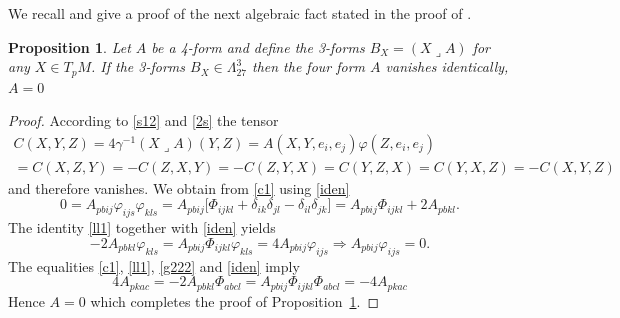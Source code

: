 \documentclass[10pt,british]{article}
\newtheorem{prop}[thrm]{Proposition}
\def\p{{\varphi}}
\def\ph{{\Phi}}
\begin{document}
We recall and give a proof of the next algebraic fact stated  in the proof of \cite[Theorem~5.4]{FI}.
\begin{prop}\cite[p. 319]{FI}\label{4-for}
Let $A$ be a 4-form and define the 3-forms $B_X=(X\lrcorner A)$ for any $X\in T_pM$. If  the 3-forms $B_X\in\Lambda^3_{27}$ then the four form $A$ vanishes identically, $A=0$
\end{prop}
\begin{proof}
According to \eqref{s12} and \eqref{2s} the tensor
\begin{multline}\label{c1}
C(X,Y,Z)=4\gamma^{-1}(X\lrcorner A)(Y,Z)=A(X,Y,e_i,e_j)\p(Z,e_i,e_j)\\=C(X,Z,Y)=-C(Z,X,Y)=-C(Z,Y,X)=C(Y,Z,X)=C(Y,X,Z)=-C(X,Y,Z)
\end{multline}
and therefore vanishes. We  obtain from \eqref{c1} using  \eqref{iden}
\begin{equation}\label{ll1}
0=A_{pbij}\p_{ijs}\p_{kls}=A_{pbij}\big[\ph_{ijkl}+\delta_{ik}\delta_{jl}-\delta_{il}\delta_{jk}  \big]=A_{pbij}\ph_{ijkl}+2A_{pbkl}.
\end{equation}
The identity \eqref{ll1} together with \eqref{iden} yields
\begin{equation}\label{g222}
-2A_{pbkl}\p_{kls}=A_{pbij}\ph_{ijkl}\p_{kls}=4A_{pbij}\p_{ijs} \Longrightarrow A_{pbij}\p_{ijs}=0.
\end{equation}
The equalities \eqref{c1}, \eqref{ll1}, \eqref{g222} and \eqref{iden} imply
\begin{equation*}
4A_{pkac}=-2A_{pbkl}\ph_{abcl}=A_{pbij}\ph_{ijkl}\ph_{abcl}=
-4A_{pkac}
\end{equation*}
Hence $A=0$ which completes the proof of Proposition~\ref{4-for}.
\end{proof}
\end{document}
